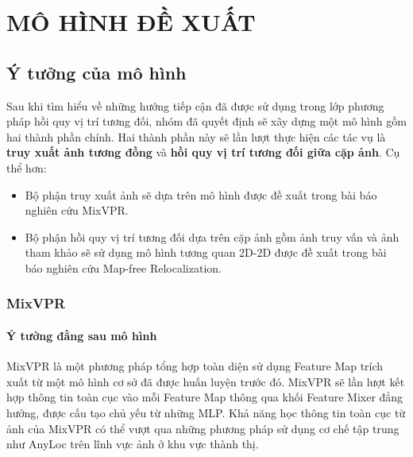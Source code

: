 \chapter{MÔ HÌNH ĐỀ XUẤT}

\section{Ý tưởng của mô hình}
Sau khi tìm hiểu về những hướng tiếp cận đã được sử dụng trong lớp phương pháp hồi quy vị trí tương đối, nhóm đã quyết định sẽ xây dựng một mô hình gồm hai thành phần chính. Hai thành phần này sẽ lần lượt thực hiện các tác vụ là \textbf{truy xuất ảnh tương đồng} và \textbf{hồi quy vị trí tương đối giữa cặp ảnh}. Cụ thể hơn:
\begin{itemize}
    \item Bộ phận truy xuất ảnh sẽ dựa trên mô hình được đề xuất trong bài báo nghiên cứu MixVPR.
    \item Bộ phận hồi quy vị trí tương đối dựa trên cặp ảnh gồm ảnh truy vấn và ảnh tham khảo sẽ sử dụng mô hình tương quan 2D-2D được đề xuất trong bài báo nghiên cứu Map-free Relocalization.
\end{itemize}

\subsection{MixVPR \cite{alibey2023mixvpr}}
\subsubsection*{Ý tưởng đằng sau mô hình}
MixVPR là một phương pháp tổng hợp toàn diện sử dụng Feature Map trích xuất từ một mô hình cơ sở đã được huấn luyện trước đó. MixVPR sẽ lần lượt kết hợp thông tin toàn cục vào mỗi Feature Map thông qua khối Feature Mixer đẳng hướng, được cấu tạo chủ yếu từ những MLP. Khả năng học thông tin toàn cục từ ảnh của MixVPR có thể vượt qua những phương pháp sử dụng cơ chế tập trung như AnyLoc \cite{keetha2023anyloc} trên lĩnh vực ảnh ở khu vực thành thị.

